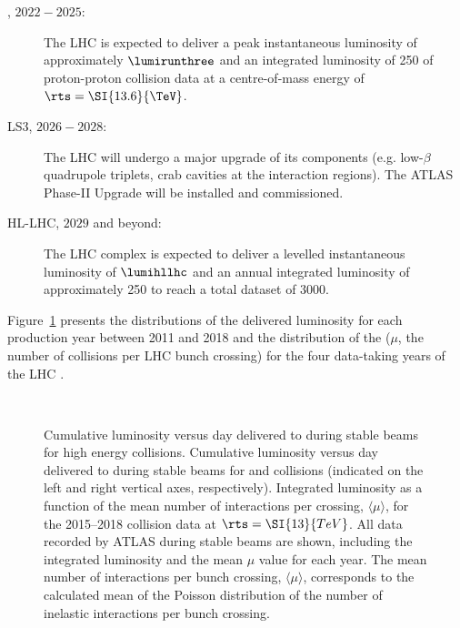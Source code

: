 \documentclass[cernpreprint, atlasdraft=false, UKenglish,british,orcidlogo, texmf, orcidlogo]{atlasdoc}
\begin{document}
\begin{description}
\item[\RunThr, $2022-2025$:] The \gls{LHC} is expected to deliver a peak instantaneous luminosity of approximately $\lumirunthree$ and an integrated luminosity of \SI{250}{\ifb} of proton-proton collision data at a centre-of-mass energy of $\rts = \SI{13.6}{\TeV}$.
 
\item[\gls{LS3}, $2026-2028$:] The \gls{LHC} will undergo a major upgrade of its components (e.g. low-$\beta$ quadrupole triplets, crab cavities at the interaction regions). The ATLAS Phase-II Upgrade will be installed and commissioned.
 
\item[\gls{HL-LHC}, $2029$ and beyond:] The \gls{LHC} complex is expected to deliver a levelled instantaneous luminosity of $\lumihllhc$ and an annual integrated luminosity of approximately \SI{250}{\ifb} to reach a total dataset of \SI{3000}{\ifb}.
 
\end{description}
 
Figure~\ref{fig:Overview:lumi-pileup} presents the distributions of the delivered luminosity for each production year between 2011 and 2018 and the distribution of the \pileup ($\mu$, the number of \pp collisions per \gls{LHC} bunch crossing) for the four data-taking years of the \gls{LHC} \RunTwo.
 
\begin{figure}[htpb]
\begin{center}
\\
\caption{\protect{} Cumulative luminosity versus day delivered to \ATLAS during stable beams for high energy \pp collisions. \protect{} Cumulative luminosity versus day delivered to \ATLAS during stable beams for \pPb and \PbPb collisions (indicated on the left and right vertical axes, respectively). \protect{} Integrated luminosity as a function of the mean number of interactions per crossing, $\langle\mu\rangle$, for the 2015--2018 \pp collision data at $\rts=\SI{13}{TeV}$. All data recorded by ATLAS during stable beams are
shown, including the integrated luminosity and the mean $\mu$ value for each year.
The mean number of interactions per bunch crossing, $\langle\mu\rangle$, corresponds to the calculated mean of the Poisson distribution
of the number of inelastic interactions per bunch crossing.
\label{fig:Overview:lumi-pileup}}
\end{center}
\end{figure}
 
\end{document}
